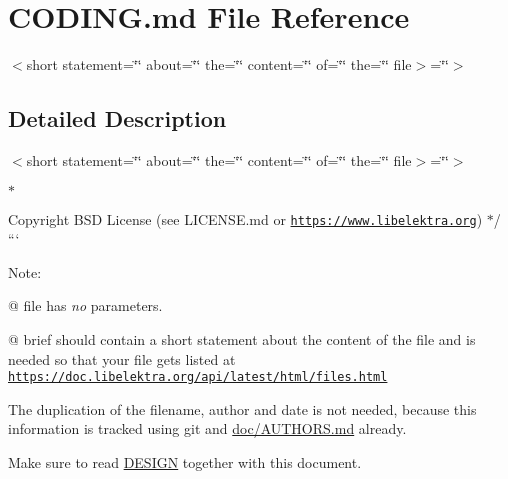 \hypertarget{CODING_8md}{}\section{C\+O\+D\+I\+N\+G.\+md File Reference}
\label{CODING_8md}


$<$short statement=\char`\"{}\char`\"{} about=\char`\"{}\char`\"{} the=\char`\"{}\char`\"{} content=\char`\"{}\char`\"{} of=\char`\"{}\char`\"{} the=\char`\"{}\char`\"{} file$>$=\char`\"{}\char`\"{}$>$
\begin{DoxyItemize}
\item 
\end{DoxyItemize} 




\subsection{Detailed Description}
$<$short statement=\char`\"{}\char`\"{} about=\char`\"{}\char`\"{} the=\char`\"{}\char`\"{} content=\char`\"{}\char`\"{} of=\char`\"{}\char`\"{} the=\char`\"{}\char`\"{} file$>$=\char`\"{}\char`\"{}$>$
\begin{DoxyItemize}
\item 
\end{DoxyItemize}


\begin{DoxyItemize}
\item 
\item $\ast$ \begin{DoxyCopyright}{Copyright}
B\+SD License (see L\+I\+C\+E\+N\+S\+E.\+md or \href{https://www.libelektra.org}{\tt https\+://www.\+libelektra.\+org}) $\ast$/ ```
\end{DoxyCopyright}
Note\+:
\end{DoxyItemize}

{\ttfamily @} {\ttfamily file} has {\itshape no} parameters.
\begin{DoxyItemize}
\item {\ttfamily @} {\ttfamily brief} should contain a short statement about the content of the file and is needed so that your file gets listed at \href{https://doc.libelektra.org/api/latest/html/files.html}{\tt https\+://doc.\+libelektra.\+org/api/latest/html/files.\+html}
\end{DoxyItemize}

The duplication of the filename, author and date is not needed, because this information is tracked using git and \hyperlink{doc_AUTHORS_md}{doc/\+A\+U\+T\+H\+O\+RS.md} already.


\begin{DoxyItemize}
\item Make sure to read \hyperlink{doc_DESIGN_md}{D\+E\+S\+I\+GN} together with this document. 
\end{DoxyItemize}